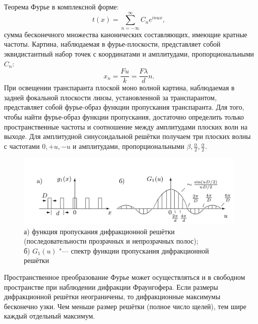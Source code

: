 \documentclass[a4paper, 12pt]{article}%
\begin{document}
Теорема Фурье в комплексной форме:
\[
	t(x) = \sum_{n = - \infty}^\infty C_n e^{inux},
\]
сумма бесконечного множества канонических составляющих, имеющие кратные частоты.
Картина, наблюдаемая в фурье-плоскости, представляет собой эквидистантный набор точек с координатами и амплитудами, пропорциональными $C_n$:
\[
	x_n = \frac{Fu}{k} = \frac{F \lambda}{d}n.
\]
При освещении транспаранта плоской моно волной картина, наблюдаемая в задней фокальной плоскости линзы, установленной за транспарантом, представляет собой фурье-образ функции пропускания транспаранта.
Для того, чтобы найти фурье-образ функции пропускания, достаточно определить только пространственные частоты и соотношение между амплитудами плоских волн на выходе. Для амплитудной синусоидальной решётки получаем три плоских волны с частотами $0, +u, -u$ и амплитудами, пропорциональными $\beta, \frac{\alpha}{2}, \frac{\alpha}{2}$.
\begin{figure}[h!]
	\includegraphics[width = 1.0\linewidth]{images/5.png}
	\caption{а) функция пропускания дифракционной решётки (последовательности прозрачных и непрозрачных полос);\\
б) $G_1 (u)$ "--- спектр функции пропускания дифракционной решётки}
\end{figure}	
Пространственное преобразование Фурье может осуществляться и в свободном пространстве при наблюдении дифракции Фраунгофера.
Если размеры дифракционной решётки неограничены, то дифракционные максимумы бесконечно узки. Чем меньше размер решётки (полное число щелей), тем шире каждый отдельный максимум.
\end{document}
